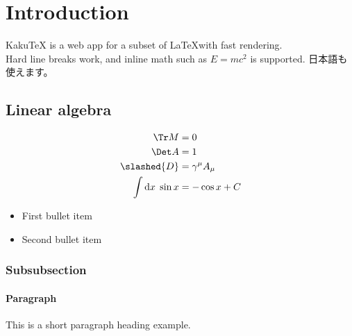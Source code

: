 \section{Introduction}
KakuTeX is a web app for a subset of \LaTeX with fast rendering.\\
Hard line breaks work, and inline math such as $E=mc^2$ is supported.
日本語も使えます。

\subsection{Linear algebra}
\begin{align}
\Tr M &= 0 \\
\Det A &= 1 \\
\slashed{D} &= \gamma^\mu A_\mu \\
\int \mathrm{d}x \; \sin x &= -\cos x + C
\end{align}

\begin{itemize}
\item First bullet item
\item Second bullet item
\end{itemize}

\subsubsection{Subsubsection}
\paragraph{Paragraph} This is a short paragraph heading example.
